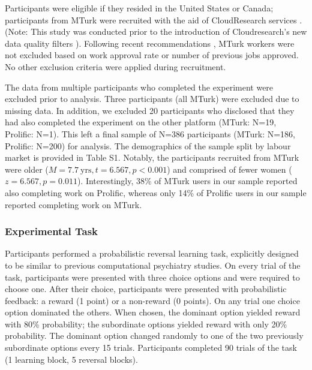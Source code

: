\documentclass[a4paper,notitlepage,12pt]{article}
\begin{document}
Participants were eligible if they resided in the United States or Canada; participants from MTurk were recruited with the aid of CloudResearch services \cite{litman2017turkprime}. (Note: This study was conducted prior to the introduction of Cloudresearch's new data quality filters \cite{cloudresearch_2020}). Following recent recommendations \cite{robinson2019tapped}, MTurk workers were not excluded based on work approval rate or number of previous jobs approved. No other exclusion criteria were applied during recruitment. 

The data from multiple participants who completed the experiment were excluded prior to analysis. Three participants (all MTurk) were excluded due to missing data. In addition, we excluded 20 participants who disclosed that they had also completed the experiment on the other platform (MTurk: N=19, Prolific: N=1). This left a final sample of N=386 participants (MTurk: N=186, Prolific: N=200) for analysis. The demographics of the sample split by labour market is provided in Table S1. Notably, the participants recruited from MTurk were older ($M = 7.7 \ \text{yrs}, t = 6.567, p < 0.001$) and comprised of fewer women ($z = 6.567, p = 0.011$). Interestingly, 38\% of MTurk users in our sample reported also completing work on Prolific, whereas only 14\% of Prolific users in our sample reported completing work on MTurk. 

\subsubsection{Experimental Task}

Participants performed a probabilistic reversal learning task, explicitly designed to be similar to previous computational psychiatry studies. On every trial of the task, participants were presented with three choice options and were required to choose one. After their choice, participants were presented with probabilistic feedback: a reward (1 point) or a non-reward (0 points). On any trial one choice option dominated the others. When chosen, the dominant option yielded reward with 80\% probability; the subordinate options yielded reward with only 20\% probability. The dominant option changed randomly to one of the two previously subordinate options every 15 trials. Participants completed 90 trials of the task (1 learning block, 5 reversal blocks). 
\end{document}
